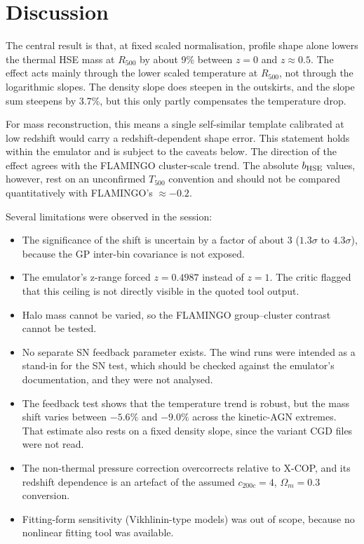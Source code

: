 \documentclass[11pt,a4paper]{article}
\begin{document}
\section{Discussion}
The central result is that, at fixed scaled normalisation, profile shape alone lowers the thermal HSE mass at $R_{500}$ by about 9\% between $z=0$ and $z\approx0.5$. The effect acts mainly through the lower scaled temperature at $R_{500}$, not through the logarithmic slopes. The density slope does steepen in the outskirts, and the slope sum steepens by 3.7\%, but this only partly compensates the temperature drop.

For mass reconstruction, this means a single self-similar template calibrated at low redshift would carry a redshift-dependent shape error. This statement holds within the emulator and is subject to the caveats below. The direction of the effect agrees with the FLAMINGO cluster-scale trend. The absolute $b_{\rm HSE}$ values, however, rest on an unconfirmed $T_{500}$ convention and should not be compared quantitatively with FLAMINGO's $\approx-0.2$.

Several limitations were observed in the session:
\begin{itemize}
\item The significance of the shift is uncertain by a factor of about 3 ($1.3\sigma$ to $4.3\sigma$), because the GP inter-bin covariance is not exposed.
\item The emulator's z-range forced $z=0.4987$ instead of $z=1$. The critic flagged that this ceiling is not directly visible in the quoted tool output.
\item Halo mass cannot be varied, so the FLAMINGO group--cluster contrast cannot be tested.
\item No separate SN feedback parameter exists. The wind runs were intended as a stand-in for the SN test, which should be checked against the emulator's documentation, and they were not analysed.
\item The feedback test shows that the temperature trend is robust, but the mass shift varies between $-5.6\%$ and $-9.0\%$ across the kinetic-AGN extremes. That estimate also rests on a fixed density slope, since the variant CGD files were not read.
\item The non-thermal pressure correction overcorrects relative to X-COP, and its redshift dependence is an artefact of the assumed $c_{200c}=4$, $\Omega_m=0.3$ conversion.
\item Fitting-form sensitivity (Vikhlinin-type models) was out of scope, because no nonlinear fitting tool was available.
\end{itemize}
\end{document}

